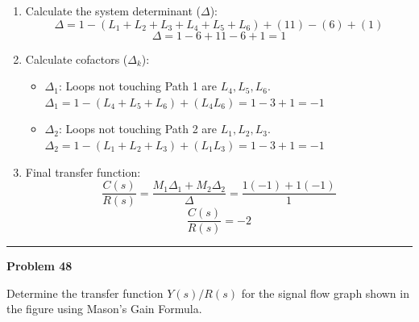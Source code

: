 \documentclass[11pt]{article}
\begin{document}
\begin{enumerate}[label=(\alph*), itemindent=*, leftmargin=*, nolistsep]
    \item Calculate the system determinant ($\Delta$):
    \[ \Delta = 1 - (L_1+L_2+L_3+L_4+L_5+L_6) + (11) - (6) + (1) \]
    \[ \Delta = 1 - 6 + 11 - 6 + 1 = 1 \]

    \item Calculate cofactors ($\Delta_k$):
    \begin{itemize}
        \item \( \Delta_1 \): Loops not touching Path 1 are \(L_4, L_5, L_6\). 
        \( \Delta_1 = 1 - (L_4+L_5+L_6) + (L_4 L_6) = 1 - 3 + 1 = -1 \)
        \item \( \Delta_2 \): Loops not touching Path 2 are \(L_1, L_2, L_3\).
        \( \Delta_2 = 1 - (L_1+L_2+L_3) + (L_1 L_3) = 1 - 3 + 1 = -1 \)
    \end{itemize}

    \item Final transfer function:
    \[ \frac{C(s)}{R(s)} = \frac{M_1 \Delta_1 + M_2 \Delta_2}{\Delta} = \frac{1(-1) + 1(-1)}{1} \]
    \[ \boxed{ \frac{C(s)}{R(s)} = -2 } \]

\end{enumerate}

\newpage
  \setcounter{page}{74}  
\noindent\rule{\textwidth}{1pt}
\noindent\textbf{Problem 48} \hfill

\noindent Determine the transfer function $Y(s)/R(s)$ for the signal flow graph shown in the figure using Mason's Gain Formula.
\end{document}
